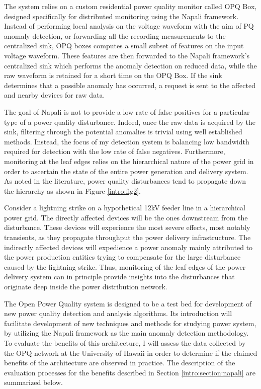 The system relies on a custom residential power quality monitor called OPQ Box, designed specifically for distributed monitoring using the Napali framework.
Instead of performing local analysis on the voltage waveform with the aim of PQ anomaly detection, or forwarding all the recording measurements to the centralized sink, OPQ boxes computes a small subset of features on the input voltage waveform.
These features are then forwarded to the Napali framework's centralized sink which performs the anomaly detection on reduced data, while the raw waveform is retained for a short time on the OPQ Box.
If the sink determines that a possible anomaly has occurred, a request is sent to the affected and nearby devices for raw data.

The goal of Napali is not to provide a low rate of false positives for a particular type of a power quality disturbance.
Indeed, once the raw data is acquired by the sink, filtering through the potential anomalies is trivial using well established methods.
Instead, the focus of my detection system is balancing low bandwidth required for detection with the low rate of false negatives.
Furthermore, monitoring at the leaf edges relies on the hierarchical nature of the power grid in order to ascertain the state of the entire power generation and delivery system.
As noted in the literature, power quality disturbances tend to propagate down the hierarchy as shown in Figure \ref{intro:fig2}.


Consider a lightning strike on a hypothetical 12kV feeder line in a hierarchical power grid.
The directly affected devices will be the ones downstream from the disturbance.
These devices will experience the most severe effects, most notably transients, as they propagate throughput the power delivery infrastructure.
The indirectly affected devices will expedience a power anomaly mainly attributed to the power production entities trying to compensate for the large disturbance caused by the lightning strike.
Thus, monitoring of the leaf edges of the power delivery system can in principle provide insights into the disturbances that originate deep inside the power distribution network.

The Open Power Quality system is designed to be a test bed for development of new power quality detection and analysis algorithms.
Its introduction will facilitate development of new techniques and methods for studying power system, by utilizing the Napali framework as the main anomaly detection methodology.
To evaluate the benefits of this architecture, I will assess the data collected by the OPQ network at the University of Hawaii in order to determine if the claimed benefits of the architecture are observed in practice.
The description of the evaluation processes for the benefits described in Section \ref{intro:section:napali} are summarized below.


